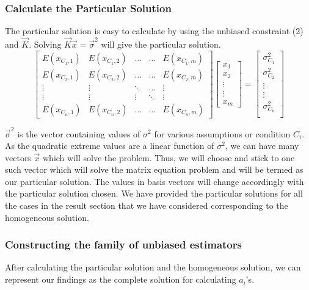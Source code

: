 \documentclass[12pt]{article}   	%
\begin{document}
\subsubsection{Calculate the Particular Solution}
The particular solution is easy to calculate by using the unbiased constraint (2) and $\vec{K}$. Solving $\vec{K}\vec{x}= \vec{\sigma}^2$  will give the particular solution.
\begin{equation}
	\begin{bmatrix}
	E(x_{C_1,1})&E(x_{C_1,2})&\dots&\dots&E(x_{C_1,m})\\
	E(x_{C_2,1})& E(x_{C_2,2})&\dots&\dots&E(x_{C_2,m})\\
	\vdots&\vdots&\ddots&\dots&\vdots\\
	\vdots&\vdots&\vdots&\ddots&\vdots\\
	E(x_{C_n,1})&E(x_{C_n,2})&\dots&\dots&E(x_{C_n,m})
	\end{bmatrix}
	\begin{bmatrix}
		x_1\\
		x_2\\
		\vdots\\
		\vdots\\
		x_m 
	\end{bmatrix}=
	\begin{bmatrix}
		\sigma^2_{C_1}\\
		\sigma^2_{C_2}\\
		\vdots\\
		\vdots\\
		\sigma^2_{C_n}\\
	\end{bmatrix}
\end{equation}

$\vec{\sigma}^2 $ is the vector containing values of $\sigma^2$ for various assumptions or condition $C_i$. As the quadratic extreme values are a linear 
function of $\sigma^2$, we can have many vectors $\vec{x}$ which will solve the problem. Thus, we will choose and stick to one such vector which will 
solve the matrix equation problem and will be termed as our particular solution. The values in basis vectors will change accordingly with the particular solution chosen. We have provided the particular solutions for all the cases in the result section that we have considered corresponding to the homogeneous solution.

\subsubsection{Constructing the family of unbiased estimators}
After calculating the particular solution and the homogeneous solution, we can represent our findings as the complete solution for calculating $a_i$'s.
\end{document}
